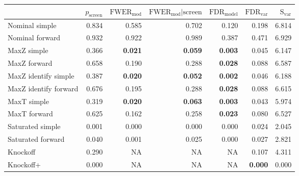 
\newcommand{\guarantee}[1]{{\bf #1}}
\begin{tabular}{|l|rrrrrr|}
 \hline
{} &  $p_{\text{screen}}$ &  $\text{FWER}_{\text{mod}}$ &  $\text{FWER}_{\text{mod}} \vert \text{screen}$ &  $\text{FDR}_{\text{model}}$ &  $\text{FDR}_{\text{var}}$ &  $\text{S}_{\text{var}}$ \\ \hline
Nominal simple & 0.834 & 0.585 & 0.702 & 0.120 & 0.198 & 6.814 \\ 
Nominal forward & 0.932 & 0.922 & 0.989 & 0.387 & 0.471 & 6.929 \\ 
MaxZ simple & 0.366 & \guarantee{0.021} & \guarantee{0.059} & \guarantee{0.003} & 0.045 & 6.147 \\ 
MaxZ forward & 0.658 & 0.190 & 0.288 & \guarantee{0.028} & 0.088 & 6.587 \\ 
MaxZ identify simple & 0.387 & \guarantee{0.020} & \guarantee{0.052} & \guarantee{0.002} & 0.046 & 6.188 \\ 
MaxZ identify forward & 0.676 & 0.195 & 0.288 & \guarantee{0.028} & 0.088 & 6.615 \\ 
MaxT simple & 0.319 & \guarantee{0.020} & \guarantee{0.063} & \guarantee{0.003} & 0.043 & 5.974 \\ 
MaxT forward & 0.625 & 0.162 & 0.258 & \guarantee{0.023} & 0.080 & 6.527 \\ 
Saturated simple & 0.001 & 0.000 & 0.000 & 0.000 & 0.024 & 2.045 \\ 
Saturated forward & 0.040 & 0.001 & 0.025 & 0.000 & 0.027 & 2.821 \\ 
Knockoff & 0.290 & NA & NA & NA & 0.107 & 4.311 \\ 
Knockoff+ & 0.000 & NA & NA & NA & \guarantee{0.000} & 0.000 \\   \hline
\end{tabular}